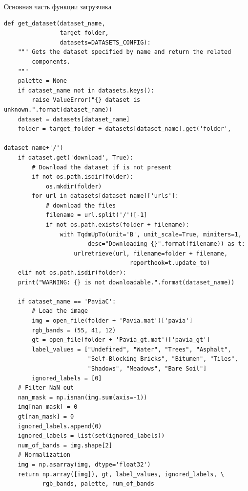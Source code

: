 \documentclass[14pt, russian]{scrartcl}
\begin{document}
\begin{listing}[H]
    \caption{Основная часть функции загрузчика}
    \label{lst:dataset_loader}
    \begin{verbatim}
def get_dataset(dataset_name,
                target_folder,
                datasets=DATASETS_CONFIG):
    """ Gets the dataset specified by name and return the related
        components.
    """
    palette = None    
    if dataset_name not in datasets.keys():
        raise ValueError("{} dataset is unknown.".format(dataset_name))
    dataset = datasets[dataset_name]
    folder = target_folder + datasets[dataset_name].get('folder',
                                                        dataset_name+'/')
    if dataset.get('download', True):
        # Download the dataset if is not present
        if not os.path.isdir(folder):
            os.mkdir(folder)
        for url in datasets[dataset_name]['urls']:
            # download the files
            filename = url.split('/')[-1]
            if not os.path.exists(folder + filename):
                with TqdmUpTo(unit='B', unit_scale=True, miniters=1,
                        desc="Downloading {}".format(filename)) as t:
                    urlretrieve(url, filename=folder + filename,
                                    reporthook=t.update_to)
    elif not os.path.isdir(folder):
    print("WARNING: {} is not downloadable.".format(dataset_name))

    if dataset_name == 'PaviaC':
        # Load the image
        img = open_file(folder + 'Pavia.mat')['pavia']
        rgb_bands = (55, 41, 12)
        gt = open_file(folder + 'Pavia_gt.mat')['pavia_gt']
        label_values = ["Undefined", "Water", "Trees", "Asphalt",
                        "Self-Blocking Bricks", "Bitumen", "Tiles", 
                        "Shadows", "Meadows", "Bare Soil"]
        ignored_labels = [0]
    # Filter NaN out
    nan_mask = np.isnan(img.sum(axis=-1))
    img[nan_mask] = 0
    gt[nan_mask] = 0
    ignored_labels.append(0)
    ignored_labels = list(set(ignored_labels))
    num_of_bands = img.shape[2]
    # Normalization
    img = np.asarray(img, dtype='float32')
    return np.array([img]), gt, label_values, ignored_labels, \
           rgb_bands, palette, num_of_bands
    \end{verbatim}
\end{listing}
\end{document}
